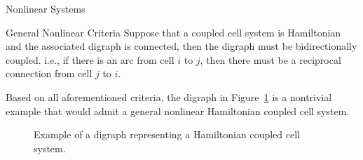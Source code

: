 \documentclass[final]{beamer}
\newlength{\onecolwid}
\begin{document}
\begin{frame}[t]
\begin{columns}[t]
\begin{column}{\onecolwid}
\begin{block}{Nonlinear Systems}
\begin{alertblock}{General Nonlinear Criteria}
Suppose that a coupled cell system is Hamiltonian and the associated digraph is connected, then the digraph must be bidirectionally coupled. i.e., if there is an arc from cell $i$ to $j$, then there must be a reciprocal connection from cell $j$ to $i$. 
\end{alertblock}
Based on all aforementioned criteria, the digraph in Figure~\ref{fig:example1} is a nontrivial  example that would admit a general nonlinear Hamiltonian coupled cell system.  
\end{block}
\begin{figure}[htb]
\begin{center}
\end{center}
\caption{Example of a digraph representing a Hamiltonian coupled cell system.}
\label{fig:example1}
\end{figure}


\end{column}
\end{columns}
\end{frame}
\end{document}
